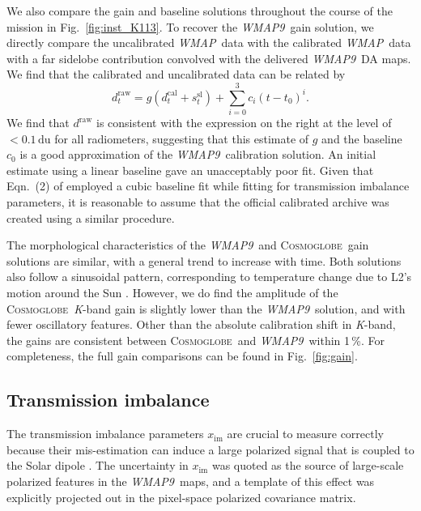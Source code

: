 \documentclass[twocolumn]{../../common/aa}
\def\WMAP{\emph{WMAP}}
\def\WMAPnine{\emph{WMAP9}}
\newcommand{\cosmoglobe}{\textsc{Cosmoglobe}}
\newcommand{\K}[0]{\textit K}
\begin{document}
We also compare the gain and baseline solutions throughout the course of the mission in Fig.~\ref{fig:inst_K113}. To recover the \WMAPnine\ gain solution, we directly compare the uncalibrated \WMAP\ data with the calibrated \WMAP\ data with a far sidelobe contribution convolved with the delivered \WMAPnine\ DA maps. We find that the calibrated and uncalibrated data can be related by
\begin{equation}
	d^\mathrm{raw}_t=g(d^\mathrm{cal}_t+s^\mathrm{sl}_t)+\sum_{i=0}^3c_i(t-t_0)^i.
\end{equation}
We find that $d^\mathrm{raw}$ is consistent with the expression on the right at the level of $<0.1\,\mathrm{du}$ for all radiometers, suggesting that this estimate of $g$ and the baseline $c_0$ is a good approximation of the \WMAPnine\ calibration solution. An initial estimate using a linear baseline gave an unacceptably poor fit. Given that Eqn.~(2) of \citet{jarosik2003a} employed a cubic baseline fit while fitting for transmission imbalance parameters, it is reasonable to assume that the official calibrated archive was created using a similar procedure.

The morphological characteristics of the \WMAPnine\ and \cosmoglobe\ gain solutions are similar, with a general trend to increase with time. Both solutions also follow a sinusoidal pattern, corresponding to temperature change due to L2's motion around the Sun \citep{wmapexsupp}. However, we do find the amplitude of the \cosmoglobe\ \K-band gain is slightly lower than the \WMAPnine\ solution, and with fewer oscillatory features. Other than the absolute calibration shift in \K-band, the gains are consistent between \cosmoglobe\ and \WMAPnine\ within 1\,\%. For completeness, the full gain comparisons can be found in Fig.~\ref{fig:gain}. 



\subsection{Transmission imbalance}
\label{sec:xim}

The transmission imbalance parameters $x_\mathrm{im}$ are crucial to measure correctly because their mis-estimation can induce a large polarized signal that is coupled to the Solar dipole \citep{jarosik2007,bp17}. The uncertainty in $x_\mathrm{im}$ was quoted as the source of large-scale polarized features in the \WMAPnine\ maps, and a template of this effect was explicitly projected out in the pixel-space polarized covariance matrix. 
\end{document}
